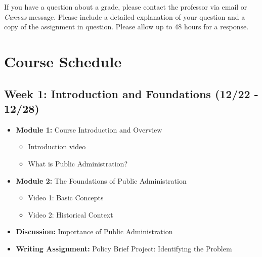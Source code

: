 \documentclass[11pt, letterpaper]{article}
\begin{document}
If you have a question about a grade, please contact the professor via email or \emph{Canvas} message. Please include a detailed explanation of your question and a copy of the assignment in question. Please allow up to 48 hours for a response. 

\section*{Course Schedule}

\subsection*{Week 1: Introduction and Foundations (12/22 - 12/28)}

\begin{itemize}
    \item \textbf{Module 1:} Course Introduction and Overview
        \begin{itemize}
            \item Introduction video
            \item What is Public Administration?
        \end{itemize}
    \item \textbf{Module 2:} The Foundations of Public Administration
        \begin{itemize}
            \item Video 1: Basic Concepts
            \item Video 2: Historical Context
        \end{itemize}
    \item \textbf{Discussion:} Importance of Public Administration
    \item \textbf{Writing Assignment:} Policy Brief Project: Identifying the Problem
\end{itemize}
\end{document}
